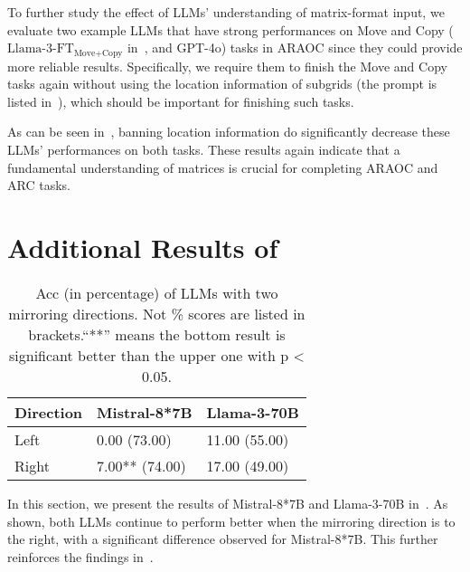To further study the effect of LLMs' understanding 
of matrix-format input, we evaluate two example LLMs that have strong performances on Move and Copy ($\text{Llama-3-FT}_{\text{Move+Copy}}$ in~, and GPT-4o) tasks in ARAOC since they could provide more reliable results. Specifically, we require them to finish the Move and Copy tasks again without using the location information of subgrids (the prompt is listed in~), which should be important for finishing such tasks. 

As can be seen in~, banning location information do significantly decrease these LLMs' performances on both tasks. These results again indicate that a fundamental understanding of matrices is crucial for completing ARAOC and ARC tasks.%

\section{Additional Results of~}
\label{appendix:additional table12}

\begin{table}[tb]
\small
\centering
\setlength{\tabcolsep}{3.5mm}
\begin{tabular}{l|ll}
\toprule
\textbf{Direction}& \textbf{Mistral-8*7B}& \textbf{Llama-3-70B} \\
\midrule[0.5pt]
Left & 0.00 (73.00) & 11.00 (55.00)\\

Right & 7.00** (74.00)& 17.00 (49.00)\\

\bottomrule
\end{tabular}
\caption{Acc (in percentage) of LLMs with two mirroring directions. Not \% scores are listed in brackets.``**'' means 
 the bottom result is significant better than the upper one with p < 0.05.}
\label{tab:autoregressive_addition}
\end{table}

In this section, we present the results of Mistral-8*7B and Llama-3-70B in~. As shown, both LLMs continue to perform better when the mirroring direction is to the right, with a significant difference observed for Mistral-8*7B. This further reinforces the findings in~.

